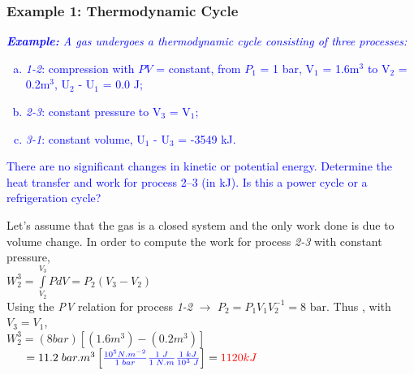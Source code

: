 \documentclass[10pt,compress]{beamer}
\begin{document}
\begin{frame}
 \frametitle{Example 1: Thermodynamic Cycle}
   \textcolor{blue}{{\it {\bf Example:} A gas undergoes a thermodynamic cycle consisting of three processes: 
   \begin{enumerate}[(a)]
    \item \textcolor{blue}{{\it 1-2}: compression with $PV$ = constant, from $P_{1}$ = 1 bar, V$_{1}$ = 1.6m$^{3}$ to V$_{2}$ = 0.2m$^{3}$, U$_{2}$ - U$_{1}$ = 0.0 J;}
    \item \textcolor{blue}{{\it 2-3}: constant pressure to V$_{3}$ = V$_{1}$;}
    \item \textcolor{blue}{{\it 3-1}: constant volume, U$_{1}$ - U$_{3}$ = -3549 kJ.}
   \end{enumerate}
   There are no significant changes in kinetic or potential energy. Determine the heat transfer and work for process 2–3 (in kJ). Is this a power cycle or a refrigeration cycle?}}

   Let's assume that the gas is a closed system and the only work done is due to volume change. In order to compute the work for process {\it 2-3} with constant pressure,\\
    $W_{2}^{3} = \int\limits_{V_{2}}^{V_{3}} P dV = P_{2}\left(V_{3}-V_{2}\right)$\\
   Using the {\it PV} relation for process {\it 1-2} $\rightarrow$ $P_{2}=P_{1}V_{1}V_{2}^{-1}=8\text{ bar}$. Thus , with $V_{3}=V_{1}$,\\
   $W_{2}^{3} = ( 8 bar ) \left[ \left( 1.6m^{3}\right) - \left( 0.2m^{3}\right) \right]$\\
   $\;\;\;\;\;\; = 11.2 \;bar.m^{3} \left[\textcolor{blue}{\frac{10^{5}N.m^{-2}}{1\; bar}\frac{1\; J}{1\; N.m}\frac{1\; kJ}{10^{3}\; J}}\right]= \textcolor{red}{1120 kJ}$
 \normalsize
\end{frame}
\end{document}
